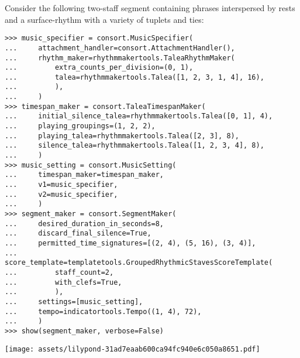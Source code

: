 Consider the following two-staff segment containing phrases interspersed by
rests and a surface-rhythm with a variety of tuplets and ties:

\begin{comment}
<abjad>[stylesheet=../consort.ily]
music_specifier = consort.MusicSpecifier(
    attachment_handler=consort.AttachmentHandler(),
    rhythm_maker=rhythmmakertools.TaleaRhythmMaker(
        extra_counts_per_division=(0, 1),
        talea=rhythmmakertools.Talea([1, 2, 3, 1, 4], 16),
        ),
    )
timespan_maker = consort.TaleaTimespanMaker(
    initial_silence_talea=rhythmmakertools.Talea([0, 1], 4),
    playing_groupings=(1, 2, 2),
    playing_talea=rhythmmakertools.Talea([2, 3], 8),
    silence_talea=rhythmmakertools.Talea([1, 2, 3, 4], 8),
    )
music_setting = consort.MusicSetting(
    timespan_maker=timespan_maker,
    v1=music_specifier,
    v2=music_specifier,
    )
segment_maker = consort.SegmentMaker(
    desired_duration_in_seconds=8,
    discard_final_silence=True,
    permitted_time_signatures=[(2, 4), (5, 16), (3, 4)],
    score_template=templatetools.GroupedRhythmicStavesScoreTemplate(
        staff_count=2,
        with_clefs=True,
        ),
    settings=[music_setting],
    tempo=indicatortools.Tempo((1, 4), 72),
    )
show(segment_maker, verbose=False)
</abjad>
\end{comment}

\begin{abjadbookoutput}
\begin{singlespacing}
\vspace{-0.5\baselineskip}
\begin{lstlisting}
>>> music_specifier = consort.MusicSpecifier(
...     attachment_handler=consort.AttachmentHandler(),
...     rhythm_maker=rhythmmakertools.TaleaRhythmMaker(
...         extra_counts_per_division=(0, 1),
...         talea=rhythmmakertools.Talea([1, 2, 3, 1, 4], 16),
...         ),
...     )
>>> timespan_maker = consort.TaleaTimespanMaker(
...     initial_silence_talea=rhythmmakertools.Talea([0, 1], 4),
...     playing_groupings=(1, 2, 2),
...     playing_talea=rhythmmakertools.Talea([2, 3], 8),
...     silence_talea=rhythmmakertools.Talea([1, 2, 3, 4], 8),
...     )
>>> music_setting = consort.MusicSetting(
...     timespan_maker=timespan_maker,
...     v1=music_specifier,
...     v2=music_specifier,
...     )
>>> segment_maker = consort.SegmentMaker(
...     desired_duration_in_seconds=8,
...     discard_final_silence=True,
...     permitted_time_signatures=[(2, 4), (5, 16), (3, 4)],
...     score_template=templatetools.GroupedRhythmicStavesScoreTemplate(
...         staff_count=2,
...         with_clefs=True,
...         ),
...     settings=[music_setting],
...     tempo=indicatortools.Tempo((1, 4), 72),
...     )
>>> show(segment_maker, verbose=False)
\end{lstlisting}
\noindent\texttt{[image: assets/lilypond-31ad7eaab600ca94fc940e6c050a8651.pdf]}
\end{singlespacing}
\end{abjadbookoutput}

